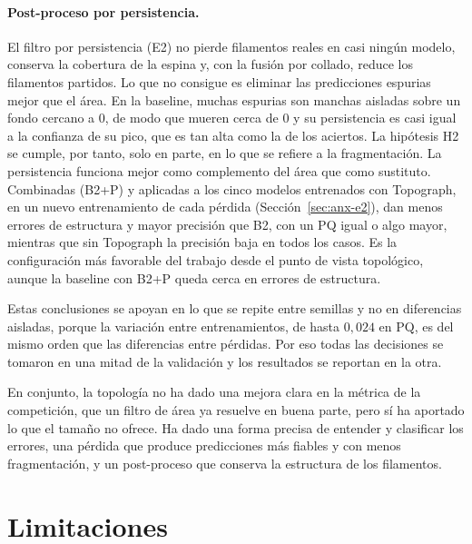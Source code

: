 \paragraph{Post-proceso por persistencia.} El filtro por persistencia
(E2) no pierde filamentos reales en casi ningún modelo, conserva la cobertura de la espina y,
con la fusión por collado, reduce los filamentos partidos. Lo que no
consigue es eliminar las predicciones espurias mejor que el área. En la
baseline, muchas espurias son manchas aisladas sobre un fondo cercano a
$0$, de modo que mueren cerca de $0$ y su persistencia es casi igual a
la confianza de su pico, que es tan alta como la de los aciertos. La
hipótesis H2 se cumple, por tanto, solo en parte, en lo que se refiere a
la fragmentación. La persistencia funciona mejor como complemento del
área que como sustituto. Combinadas (B2+P) y aplicadas a los cinco
modelos entrenados con Topograph, en un nuevo entrenamiento de cada
pérdida (Sección~\ref{sec:anx-e2}), dan menos errores de estructura y
mayor precisión que B2, con un PQ igual o algo mayor, mientras que sin
Topograph la precisión baja en todos los casos. Es la configuración más
favorable del trabajo desde el punto de vista topológico, aunque la
baseline con B2+P queda cerca en errores de estructura.

Estas conclusiones se apoyan en lo que se repite entre semillas y no en
diferencias aisladas, porque la variación entre entrenamientos, de hasta
$0{,}024$ en PQ, es del mismo orden que las diferencias entre pérdidas.
Por eso todas las decisiones se tomaron en una mitad de la validación y
los resultados se reportan en la otra.

En conjunto, la topología no ha dado una mejora clara en la métrica de
la competición, que un filtro de área ya resuelve en buena parte, pero
sí ha aportado lo que el tamaño no ofrece. Ha dado una forma precisa de
entender y clasificar los errores, una pérdida que produce predicciones
más fiables y con menos fragmentación, y un post-proceso que conserva la
estructura de los filamentos.

\section{Limitaciones}

